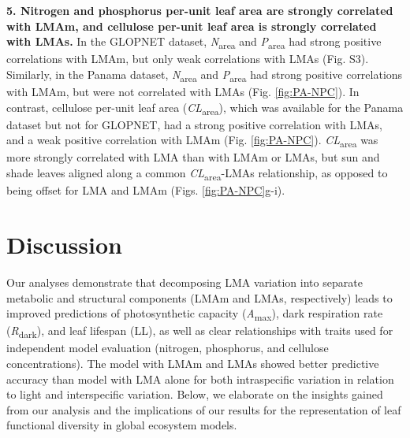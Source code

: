 \documentclass[
  12pt,
]{article}
\begin{document}
\textbf{5. Nitrogen and phosphorus per-unit leaf area are strongly correlated with LMAm, and cellulose per-unit leaf area is strongly correlated with LMAs.}
In the GLOPNET dataset, \emph{N}\textsubscript{area} and \emph{P}\textsubscript{area} had strong positive correlations with LMAm, but only weak correlations with LMAs (Fig. S3).
Similarly, in the Panama dataset, \emph{N}\textsubscript{area} and \emph{P}\textsubscript{area} had strong positive correlations with LMAm, but were not correlated with LMAs (Fig. \ref{fig:PA-NPC}).
In contrast, cellulose per-unit leaf area (\emph{CL}\textsubscript{area}), which was available for the Panama dataset but not for GLOPNET, had a strong positive correlation with LMAs, and a weak positive correlation with LMAm (Fig. \ref{fig:PA-NPC}).
\emph{CL}\textsubscript{area} was more strongly correlated with LMA than with LMAm or LMAs, but sun and shade leaves aligned along a common \emph{CL}\textsubscript{area}-LMAs relationship, as opposed to being offset for LMA and LMAm (Figs. \ref{fig:PA-NPC}g-i).

\hypertarget{discussion}{%
\section{Discussion}\label{discussion}}

Our analyses demonstrate that decomposing LMA variation into separate metabolic and structural components (LMAm and LMAs, respectively) leads to improved predictions of photosynthetic capacity (\emph{A}\textsubscript{max}), dark respiration rate (\emph{R}\textsubscript{dark}), and leaf lifespan (LL), as well as clear relationships with traits used for independent model evaluation (nitrogen, phosphorus, and cellulose concentrations).
The model with LMAm and LMAs showed better predictive accuracy than model with LMA alone for both intraspecific variation in relation to light and interspecific variation.
Below, we elaborate on the insights gained from our analysis and the implications of our results for the representation of leaf functional diversity in global ecosystem models.
\end{document}
